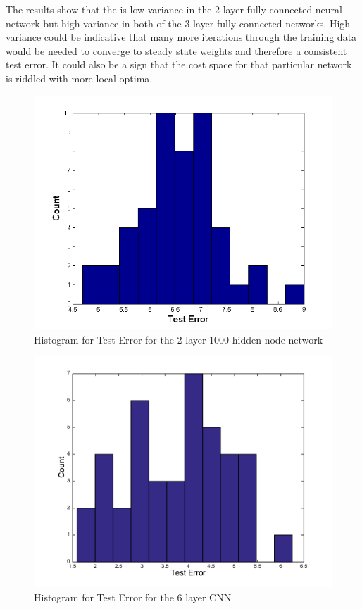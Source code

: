 \documentclass[12pt, twocolumn]{article}
\begin{document}
The results show that the is low variance in the 2-layer fully connected neural network but high variance in both of the 3 layer fully connected networks. High variance could be indicative that many more iterations through the training data would be needed to converge to steady state weights and therefore a consistent test error. It could also be a sign that the cost space for that particular network is riddled with more local optima.  


\begin{figure}
\includegraphics[scale=.5]{hist2layer.png}
\caption{Histogram for Test Error for the 2 layer 1000 hidden node network}
\label{fig:hist2layer}
\end{figure}

\begin{figure}
	\includegraphics[scale=.45]{histlenet.png}
	\caption{Histogram for Test Error for the 6 layer CNN}
	\label{fig:histlenet}
\end{figure}
\end{document}
